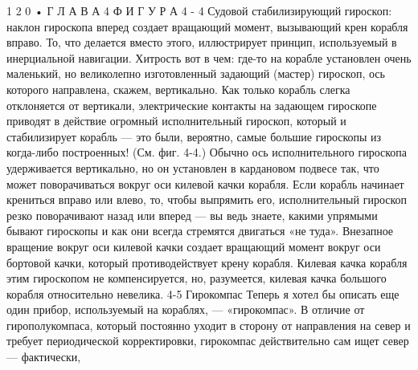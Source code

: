 \documentclass[10pt,oneside]{article}
\begin{document}
1 2 0 • Г Л А В А  4 Ф И Г У Р А  4 - 4 Судовой стабилизирующий гироскоп: наклон гироскопа вперед создает вращающий момент, вызывающий крен корабля вправо. То, что делается вместо этого, иллюстрирует принцип, используемый в инерциальной навигации. Хитрость вот в чем: где-то на корабле установлен очень маленький, но великолепно изготовленный задающий (мастер) гироскоп, ось которого направлена, скажем, вертикально. Как только корабль слегка отклоняется от вертикали, электрические контакты на задающем гироскопе приводят в действие огромный исполнительный гироскоп, который и стабилизирует корабль --- это были, вероятно, самые большие гироскопы из когда-либо построенных! (См. фиг. 4-4.) Обычно ось исполнительного гироскопа удерживается вертикально, но он установлен в кардановом подвесе так, что может поворачиваться вокруг оси килевой качки корабля. Если корабль начинает крениться вправо или влево, то, чтобы выпрямить его, исполнительный гироскоп резко поворачивают назад или вперед --- вы ведь знаете, какими упрямыми бывают гироскопы и как они всегда стремятся двигаться «не туда». Внезапное вращение вокруг оси килевой качки создает вращающий момент вокруг оси бортовой качки, который противодействует крену корабля. Килевая качка корабля этим гироскопом не компенсируется, но, разумеется, килевая качка большого корабля относительно невелика. 4-5 Гирокомпас Теперь я хотел бы описать еще один прибор, используемый на кораблях, --- «гирокомпас». В отличие от гирополукомпаса, который постоянно уходит в сторону от направления на север и требует периодической корректировки, гирокомпас действительно сам ищет север --- фактически,\par
\end{document}
